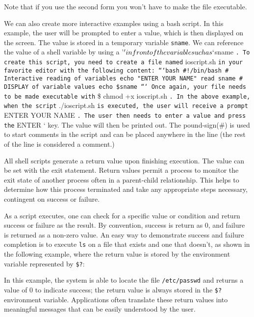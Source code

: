 Note that if you use the second form you won't have to make the file
executable.

We can also create more interactive examples using a bash script. In
this example, the user will be prompted to enter a value, which is then
displayed on the screen. The value is stored in a temporary variable
\texttt{sname}. We can reference the value of a shell variable by using
a '$' in front of the variable such as ` $sname
\texttt{. To create this script, you need to create a file named}
ioscript.sh
\texttt{in your favorite editor with the following content: ```bash \#!/bin/bash \# Interactive reading of variables echo "ENTER YOUR NAME" read sname \# DISPLAY of variable values echo \$sname ``` Once again, your file needs to be made executable with}
\$ chmod +x ioscript.sh \texttt{. In the above example, when the script}
./ioscript.sh \texttt{is executed, the user will receive a prompt} ENTER
YOUR NAME \texttt{. The user then needs to enter a value and press the}
ENTER ` key. The value will then be printed out. The pound-sign(\#) is
used to start comments in the script and can be placed anywhere in the
line (the rest of the line is considered a comment.)

All shell scripts generate a return value upon finishing execution. The
value can be set with the exit statement. Return values permit a process
to monitor the exit state of another process often in a parent-child
relationship. This helps to determine how this process terminated and
take any appropriate steps necessary, contingent on success or failure.

As a script executes, one can check for a specific value or condition
and return success or failure as the result. By convention, success is
return as 0, and failure is returned as a non-zero value. An easy way to
demonstrate success and failure completion is to execute \texttt{ls} on
a file that exists and one that doesn't, as shown in the following
example, where the return value is stored by the environment variable
represented by \texttt{\$?}:

\begin{Shaded}
\begin{Highlighting}[]
\NormalTok{$ } 

\NormalTok{$ } 
\end{Highlighting}
\end{Shaded}

In this example, the system is able to locate the file
\texttt{/etc/passwd} and returns a value of 0 to indicate success; the
return value is always stored in the \texttt{\$?} environment variable.
Applications often translate these return values into meaningful
messages that can be easily understood by the user.

